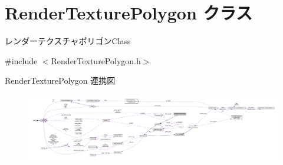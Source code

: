 \hypertarget{class_render_texture_polygon}{}\section{Render\+Texture\+Polygon クラス}
\label{class_render_texture_polygon}


レンダーテクスチャポリゴン\+Class  




{\ttfamily \#include $<$Render\+Texture\+Polygon.\+h$>$}



Render\+Texture\+Polygon 連携図\nopagebreak
\begin{figure}[H]
\begin{center}
\leavevmode
\includegraphics[width=350pt]{class_render_texture_polygon__coll__graph}
\end{center}
\end{figure}
